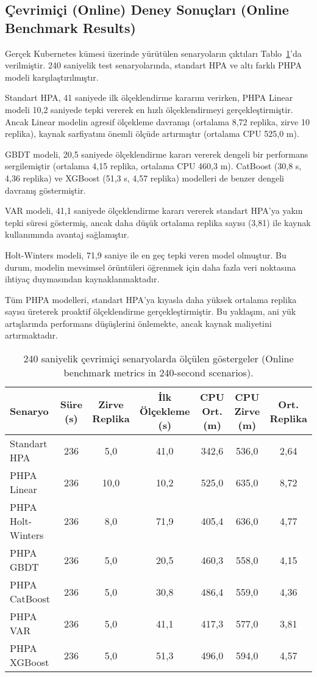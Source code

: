 
\subsection{Çevrimiçi (Online) Deney Sonuçları (Online Benchmark Results)}

Gerçek Kubernetes kümesi üzerinde yürütülen senaryoların çıktıları Tablo~\ref{tab:online}'da verilmiştir. 240 saniyelik test senaryolarında, standart HPA ve altı farklı PHPA modeli karşılaştırılmıştır.

Standart HPA, 41 saniyede ilk ölçeklendirme kararını verirken, PHPA Linear modeli 10,2 saniyede tepki vererek en hızlı ölçeklendirmeyi gerçekleştirmiştir. Ancak Linear modelin agresif ölçekleme davranışı (ortalama 8,72 replika, zirve 10 replika), kaynak sarfiyatını önemli ölçüde artırmıştır (ortalama CPU 525,0 m).

GBDT modeli, 20,5 saniyede ölçeklendirme kararı vererek dengeli bir performans sergilemiştir (ortalama 4,15 replika, ortalama CPU 460,3 m). CatBoost (30,8 s, 4,36 replika) ve XGBoost (51,3 s, 4,57 replika) modelleri de benzer dengeli davranış göstermiştir.

VAR modeli, 41,1 saniyede ölçeklendirme kararı vererek standart HPA'ya yakın tepki süresi göstermiş, ancak daha düşük ortalama replika sayısı (3,81) ile kaynak kullanımında avantaj sağlamıştır.

Holt-Winters modeli, 71,9 saniye ile en geç tepki veren model olmuştur. Bu durum, modelin mevsimsel örüntüleri öğrenmek için daha fazla veri noktasına ihtiyaç duymasından kaynaklanmaktadır.

Tüm PHPA modelleri, standart HPA'ya kıyasla daha yüksek ortalama replika sayısı üreterek proaktif ölçeklendirme gerçekleştirmiştir. Bu yaklaşım, ani yük artışlarında performans düşüşlerini önlemekte, ancak kaynak maliyetini artırmaktadır.

\begin{table}[h]
    \centering
    \caption{240 saniyelik çevrimiçi senaryolarda ölçülen göstergeler (Online benchmark metrics in 240-second scenarios).}
    \label{tab:online}
    \begin{tabular}{@{}lcccccc@{}}
        \toprule
        Senaryo & Süre (s) & Zirve Replika & İlk Ölçekleme (s) & CPU Ort. (m) & CPU Zirve (m) & Ort. Replika \\
        \midrule
        Standart HPA & 236 & 5,0 & 41,0 & 342,6 & 536,0 & 2,64 \\
        PHPA Linear & 236 & 10,0 & 10,2 & 525,0 & 635,0 & 8,72 \\
        PHPA Holt-Winters & 236 & 8,0 & 71,9 & 405,4 & 636,0 & 4,77 \\
        PHPA GBDT & 236 & 5,0 & 20,5 & 460,3 & 558,0 & 4,15 \\
        PHPA CatBoost & 236 & 5,0 & 30,8 & 486,4 & 559,0 & 4,36 \\
        PHPA VAR & 236 & 5,0 & 41,1 & 417,3 & 577,0 & 3,81 \\
        PHPA XGBoost & 236 & 5,0 & 51,3 & 496,0 & 594,0 & 4,57 \\
        \bottomrule
    \end{tabular}
\end{table}

